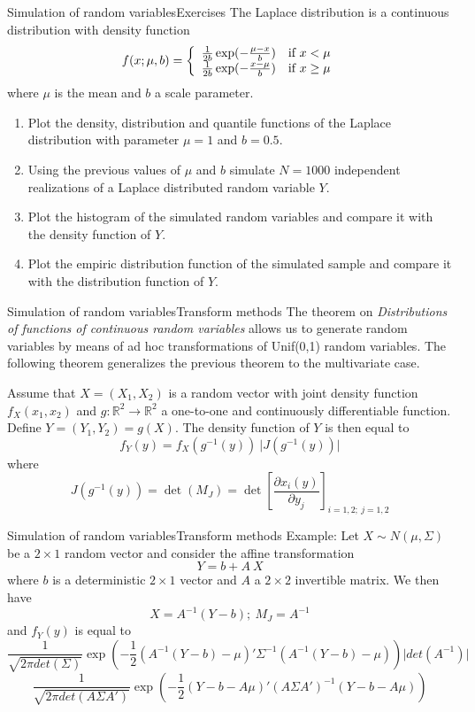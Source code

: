 \documentclass[handout]{beamer}
\begin{document}
\begin{frame}{Simulation of random variables}{Exercises}
The Laplace distribution is a continuous distribution with density function
\[f(x;\mu,b)=\left\{\begin{array}{ll}
\frac{1}{2b}\exp(- \frac{\mu - x}{b}) & \textnormal{if } x < \mu\\
\frac{1}{2b}\exp(- \frac{x - \mu}{b}) & \textnormal{if } x \geq \mu
\end{array} \right.
\]
where $\mu$ is the mean and $b$ a scale parameter.
\begin{enumerate}
\item Plot the density, distribution and quantile functions of the Laplace distribution with parameter 
$\mu=1$ and $b=0.5$.
\item Using the previous values of $\mu$ and $b$ simulate $N=1000$ independent realizations of a Laplace distributed random variable $Y$.
\item Plot the histogram of the simulated random variables and compare it with the density function of $Y$.
\item Plot the empiric distribution function of the simulated sample and compare it with the distribution function of $Y$.
\end{enumerate}
\end{frame}

\begin{frame}{Simulation of random variables}{Transform methods}
The theorem on \emph{Distributions of functions of continuous random variables} allows us to
generate random variables by means of ad hoc transformations of Unif(0,1) random variables. The following theorem generalizes
the previous theorem to the multivariate case.
\begin{Theorem}
Assume that $X=(X_1,X_2)$ is a random vector with joint density function $f_X(x_1,x_2)$ and $g: \mathbb{R}^2 \rightarrow \mathbb{R}^2$ a one-to-one 
and continuously differentiable function. Define $Y=(Y_1,Y_2)=g(X)$. The density function of $Y$ is then equal to
\[
 f_Y(y)=f_X(g^{-1}(y)) \ \rvert J(g^{-1}(y)) \rvert
\]
where \[
       J(g^{-1}(y)) = \det (M_J) = \det \left [ \frac{\partial x_i(y)}{\partial y_j}\right ]_{i=1,2; \ j=1,2}
      \]
\end{Theorem}
\end{frame}

\begin{frame}{Simulation of random variables}{Transform methods}
Example: Let $X \sim N(\mu, \Sigma)$ be a $2 \times 1$ random vector and consider the affine transformation
\[
 Y = b + A \ X
\]
where $b$ is a deterministic $2 \times 1$ vector and $A$ a $2 \times 2$ invertible matrix. We then have
\[
 X = A^{-1}(Y-b); \ M_J = A^{-1} 
\]
and $f_Y(y)$ is equal to
\[
\frac{1}{\sqrt{2 \pi det(\Sigma)}} \exp(-\frac{1}{2} (A^{-1}(Y-b) - \mu)'\Sigma^{-1} (A^{-1}(Y-b) - \mu)) \rvert det(A^{-1}) \rvert 
\] 
\[
\frac{1}{\sqrt{2 \pi det(A\Sigma A')}} \exp(-\frac{1}{2} (Y - b - A\mu)'(A\Sigma A')^{-1} (Y - b - A\mu))  
\]  
\end{frame}
\end{document}
